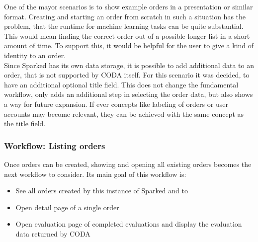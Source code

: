 One of the mayor scenarios is to show example orders in a presentation or similar format. Creating and starting an order from scratch in such a situation has the problem, that the runtime for machine learning tasks can be quite substantial. This would mean finding the correct order out of a possible longer list in a short amount of time. To support this, it would be helpful for the user to give a kind of identity to an order. \\
Since Sparked has its own data storage, it is possible to add additional data to an order, that is not supported by CODA itself. For this scenario it was decided, to have an additional optional title field. This does not change the fundamental workflow, only adds an additional step in selecting the order data, but also shows a way for future expansion. If ever concepts like labeling of orders or user accounts may become relevant, they can be achieved with the same concept as the title field.

\subsubsection{Workflow: Listing orders}
Once orders can be created, showing and opening all existing orders becomes the next workflow to consider. 
Its main goal of this workflow is:

\begin{itemize}
\item See all orders created by this instance of Sparked and to 
\item Open detail page of a single order
\item Open evaluation page of completed evaluations and display the evaluation data returned by CODA
\end{itemize}

